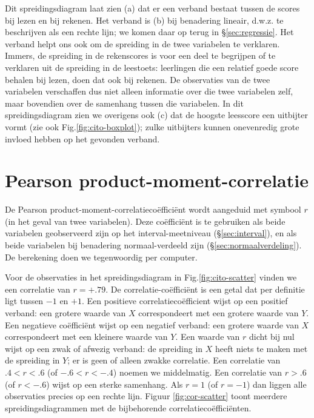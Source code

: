 \documentclass[
]{book}
\begin{document}
Dit spreidingsdiagram laat zien (a) dat er een verband bestaat tussen de
scores bij lezen en bij rekenen. Het verband is (b) bij benadering lineair, d.w.z. te
beschrijven als een rechte lijn; we komen daar op terug in
§\ref{sec:regressie}.
Het verband helpt ons ook om de spreiding in de twee variabelen te
verklaren. Immers, de spreiding in de rekenscores is voor een deel te
begrijpen of te verklaren uit de spreiding in de leestoets: leerlingen
die een relatief goede score behalen bij lezen, doen dat ook bij
rekenen. De observaties van de twee variabelen verschaffen dus niet
alleen informatie over die twee variabelen zelf, maar bovendien over de
samenhang tussen die variabelen. In dit spreidingsdiagram zien we
overigens ook (c) dat de hoogste leesscore een uitbijter vormt (zie ook
Fig.\ref{fig:cito-boxplot}); zulke uitbijters kunnen onevenredig
grote invloed hebben op het gevonden verband.

\hypertarget{sec:Pearson}{%
\section{Pearson product-moment-correlatie}\label{sec:Pearson}}

De Pearson product-moment-correlatiecoëfficiënt wordt aangeduid met
symbool \(r\) (in het geval van twee variabelen). Deze coëfficiënt is te
gebruiken als beide variabelen geobserveerd zijn op het
interval-meetniveau
(§\ref{sec:interval}), en als beide variabelen bij benadering
normaal-verdeeld zijn
(§\ref{sec:normaalverdeling}). De berekening doen we tegenwoordig
per computer.

Voor de observaties in het spreidingsdiagram in
Fig.\ref{fig:cito-scatter} vinden we een correlatie van \(r=+.79\). De
correlatie-coëfficiënt is een getal dat per definitie ligt tussen \(-1\)
en \(+1\). Een positieve correlatiecoëfficient wijst op een positief
verband: een grotere waarde van \(X\) correspondeert met een grotere
waarde van \(Y\). Een negatieve coëfficiënt wijst op een negatief verband:
een grotere waarde van \(X\) correspondeert met een kleinere waarde van
\(Y\). Een waarde van \(r\) dicht bij nul wijst op een zwak of afwezig
verband: de spreiding in \(X\) heeft niets te maken met de spreiding in
\(Y\); er is geen of alleen zwakke correlatie. Een correlatie van
\(.4<r<.6\) (of \(-.6 < r < -.4\)) noemen we middelmatig. Een correlatie van
\(r>.6\) (of \(r< -.6\)) wijst op een sterke samenhang. Als \(r=1\) (of
\(r=-1\)) dan liggen alle observaties precies op een rechte lijn.
Figuur \ref{fig:cor-scatter} toont meerdere spreidingsdiagrammen met de
bijbehorende correlatiecoëfficiënten.
\end{document}
